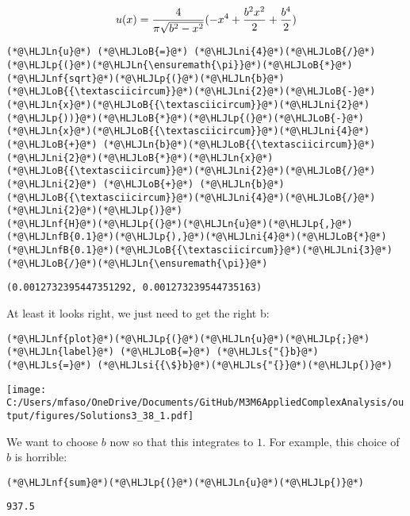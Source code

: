 \documentclass[12pt,landscape]{article}
\newcommand{\HLJLn}[1]{#1}
\newcommand{\HLJLnf}[1]{\textcolor[RGB]{66,102,213}{#1}}
\newcommand{\HLJLs}[1]{\textcolor[RGB]{201,61,57}{#1}}
\newcommand{\HLJLsi}[1]{#1}
\newcommand{\HLJLnfB}[1]{\textcolor[RGB]{59,151,46}{#1}}
\newcommand{\HLJLni}[1]{\textcolor[RGB]{59,151,46}{#1}}
\newcommand{\HLJLoB}[1]{\textcolor[RGB]{102,102,102}{\textbf{#1}}}
\newcommand{\HLJLp}[1]{#1}
\begin{document}
{\[
u(x) = {4 \over \pi \sqrt{b^2 - x^2}}(-x^4+{b^2 x^2 \over 2} + {b^4 \over 2})
\]
\newpage
\begin{lstlisting}
(*@\HLJLn{u}@*) (*@\HLJLoB{=}@*) (*@\HLJLni{4}@*)(*@\HLJLoB{/}@*)(*@\HLJLp{(}@*)(*@\HLJLn{\ensuremath{\pi}}@*)(*@\HLJLoB{*}@*)(*@\HLJLnf{sqrt}@*)(*@\HLJLp{(}@*)(*@\HLJLn{b}@*)(*@\HLJLoB{{\textasciicircum}}@*)(*@\HLJLni{2}@*)(*@\HLJLoB{-}@*)(*@\HLJLn{x}@*)(*@\HLJLoB{{\textasciicircum}}@*)(*@\HLJLni{2}@*)(*@\HLJLp{))}@*)(*@\HLJLoB{*}@*)(*@\HLJLp{(}@*)(*@\HLJLoB{-}@*)(*@\HLJLn{x}@*)(*@\HLJLoB{{\textasciicircum}}@*)(*@\HLJLni{4}@*) (*@\HLJLoB{+}@*) (*@\HLJLn{b}@*)(*@\HLJLoB{{\textasciicircum}}@*)(*@\HLJLni{2}@*)(*@\HLJLoB{*}@*)(*@\HLJLn{x}@*)(*@\HLJLoB{{\textasciicircum}}@*)(*@\HLJLni{2}@*)(*@\HLJLoB{/}@*)(*@\HLJLni{2}@*) (*@\HLJLoB{+}@*) (*@\HLJLn{b}@*)(*@\HLJLoB{{\textasciicircum}}@*)(*@\HLJLni{4}@*)(*@\HLJLoB{/}@*)(*@\HLJLni{2}@*)(*@\HLJLp{)}@*)
(*@\HLJLnf{H}@*)(*@\HLJLp{(}@*)(*@\HLJLn{u}@*)(*@\HLJLp{,}@*) (*@\HLJLnfB{0.1}@*)(*@\HLJLp{),}@*)(*@\HLJLni{4}@*)(*@\HLJLoB{*}@*)(*@\HLJLnfB{0.1}@*)(*@\HLJLoB{{\textasciicircum}}@*)(*@\HLJLni{3}@*)(*@\HLJLoB{/}@*)(*@\HLJLn{\ensuremath{\pi}}@*)
\end{lstlisting}

\begin{lstlisting}
(0.0012732395447351292, 0.001273239544735163)
\end{lstlisting}


At least it looks right, we just need to get the right b:


\begin{lstlisting}
(*@\HLJLnf{plot}@*)(*@\HLJLp{(}@*)(*@\HLJLn{u}@*)(*@\HLJLp{;}@*) (*@\HLJLn{label}@*) (*@\HLJLoB{=}@*) (*@\HLJLs{"{}b}@*) (*@\HLJLs{=}@*) (*@\HLJLsi{{\$}b}@*)(*@\HLJLs{"{}}@*)(*@\HLJLp{)}@*)
\end{lstlisting}

\texttt{[image: C:/Users/mfaso/OneDrive/Documents/GitHub/M3M6AppliedComplexAnalysis/output/figures/Solutions3\_38\_1.pdf]}

We want to choose $b$ now so that this integrates to $1$. For example, this choice of $b$ is horrible:


\begin{lstlisting}
(*@\HLJLnf{sum}@*)(*@\HLJLp{(}@*)(*@\HLJLn{u}@*)(*@\HLJLp{)}@*)
\end{lstlisting}

\begin{lstlisting}
937.5
\end{lstlisting}


}
\end{document}
